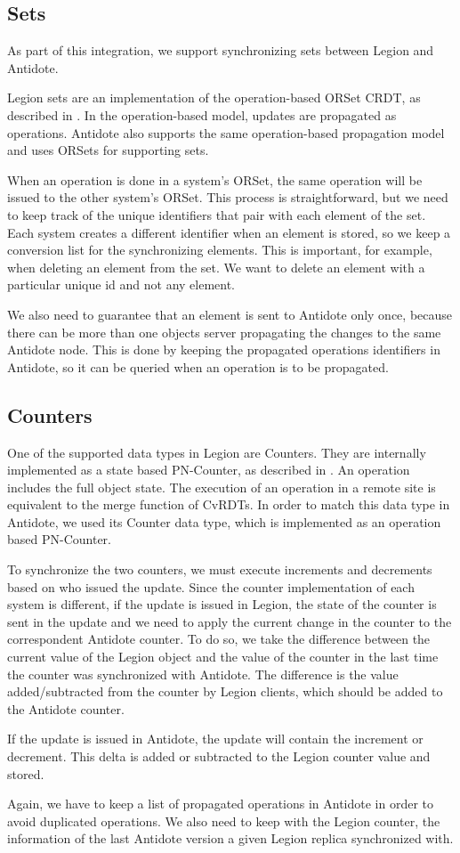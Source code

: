 \subsection{Sets}
\label{sec:sets}
As part of this integration, we support synchronizing sets between Legion and Antidote.\par Legion sets are an implementation of the operation-based ORSet CRDT, as described in \cite{crdt}. In the operation-based model, updates are propagated as operations. Antidote also supports the same operation-based propagation model and uses ORSets for supporting sets.\par
	When an operation is done in a system's ORSet, the same operation will be issued to the other system's ORSet. This process is straightforward, but we need to keep track of the unique identifiers that pair with each element of the set. Each system creates a different identifier when an element is stored, so we keep a conversion list for the synchronizing elements. This is important, for example, when deleting an element from the set. We want to delete an element with a particular unique id and not any element.\par
	We also need to guarantee that an element is sent to Antidote only once, because there can be more than one objects server propagating the changes to the same Antidote node. This is done by keeping the propagated operations identifiers in Antidote, so it can be queried when an operation is to be propagated.

\subsection{Counters}
\label{sec:counters}
One of the supported data types in Legion are Counters. They are internally implemented as a state based PN-Counter, as described in \cite{crdt}. An operation includes the full object state. The execution of an operation in a remote site is equivalent to the merge function of CvRDTs. In order to match this data type in Antidote, we used its Counter data type, which is implemented as an operation based PN-Counter.\par
	To synchronize the two counters, we must execute increments and decrements based on who issued the update. Since the counter implementation of each system is different, if the update is issued in Legion, the state of the counter is sent in the update and we need to apply the current change in the counter to the correspondent Antidote counter. To do so, we take the difference between the current value of the Legion object and the value of the counter in the last time the counter was synchronized with Antidote. The difference is the value added/subtracted from the counter by Legion clients, which should be added to the Antidote counter.\par
	If the update is issued in Antidote, the update will contain the increment or decrement. This delta is added or subtracted to the Legion counter value and stored.\par
	Again, we have to keep a list of propagated operations in Antidote in order to avoid duplicated operations. We also need to keep with the Legion counter, the information of the last Antidote version a given Legion replica synchronized with.

